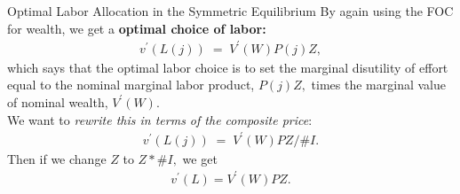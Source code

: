 \documentclass[10pt,c,aspectratio=1610,handout]{beamer}
\begin{document}
\begin{frame}{Optimal Labor Allocation in the Symmetric Equilibrium}%
    By again using the FOC for wealth, we get a \textbf{optimal choice of labor:}%
    \begin{align}%
      v^{\prime }(L(j)) \; = \; V^{\prime }(W)P(j)Z,  \label{foc labor A}%
    \end{align}%
    which says that the optimal labor choice is to set the marginal disutility of effort equal to the nominal marginal labor product, $P(j)Z,$ times the marginal value of nominal wealth, $V^{\prime }(W)$.\\%
    \vspace*{0.3in}%
    \pause%
    We want to \emph{rewrite this in terms of the composite price}:%
    \begin{align*}%
      v^{\prime }(L(j)) \; = \; V^{\prime }(W)PZ/\#I.%
    \end{align*}%
    \pause%
    Then if we change $Z$ to $Z\ast \#I,$ we get%
    \begin{align*}%
      v^{\prime }(L)=V^{\prime }(W)PZ.%
    \end{align*}%
\end{frame}%
\end{document}
